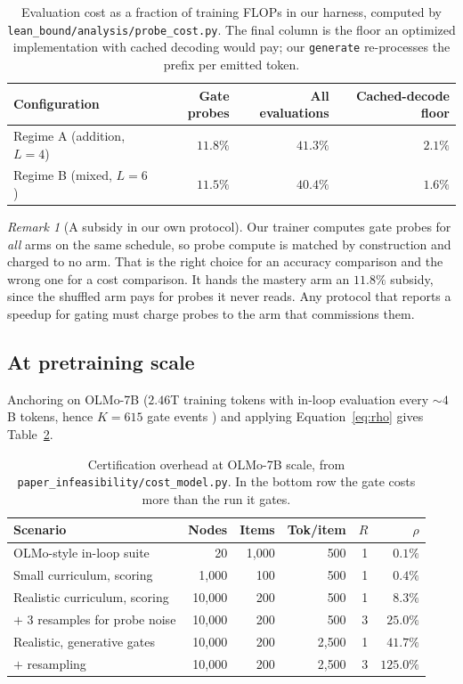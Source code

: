 \documentclass[11pt]{article}
\theoremstyle{plain}
\theoremstyle{definition}
\theoremstyle{remark}
\newtheorem{remark}{Remark}
\begin{document}
\begin{table}[ht]
\centering
\small
\begin{tabular}{@{}lrrr@{}}
\toprule
Configuration & Gate probes & All evaluations & Cached-decode floor \\
\midrule
Regime A (addition, $L{=}4$) & $11.8\%$ & $41.3\%$ & $2.1\%$ \\
Regime B (mixed, $L{=}6$) & $11.5\%$ & $40.4\%$ & $1.6\%$ \\
\bottomrule
\end{tabular}
\caption{Evaluation cost as a fraction of training FLOPs in our harness,
computed by \texttt{lean\_bound/analysis/probe\_cost.py}. The final column is the
floor an optimized implementation with cached decoding would pay; our
\texttt{generate} re-processes the prefix per emitted token.}
\label{tab:ourcost}
\end{table}

\begin{remark}[A subsidy in our own protocol]
Our trainer computes gate probes for \emph{all} arms on the same schedule, so
probe compute is matched by construction and charged to no arm. That is the right
choice for an accuracy comparison and the wrong one for a cost comparison. It
hands the mastery arm an $11.8\%$ subsidy, since the shuffled arm pays for probes
it never reads. Any protocol that reports a speedup for gating must charge probes
to the arm that commissions them.
\end{remark}

\subsection{At pretraining scale}

Anchoring on OLMo-7B ($2.46$T training tokens with in-loop evaluation every
${\sim}4$B tokens, hence $K = 615$ gate events \citep{groeneveld2024olmo}) and
applying Equation~\ref{eq:rho} gives Table~\ref{tab:scalecost}.

\begin{table}[ht]
\centering
\small
\begin{tabular}{@{}lrrrrr@{}}
\toprule
Scenario & Nodes & Items & Tok/item & $R$ & $\rho$ \\
\midrule
OLMo-style in-loop suite & 20 & 1{,}000 & 500 & 1 & $0.1\%$ \\
Small curriculum, scoring & 1{,}000 & 100 & 500 & 1 & $0.4\%$ \\
Realistic curriculum, scoring & 10{,}000 & 200 & 500 & 1 & $8.3\%$ \\
\quad $+$ 3 resamples for probe noise & 10{,}000 & 200 & 500 & 3 & $25.0\%$ \\
Realistic, generative gates & 10{,}000 & 200 & 2{,}500 & 1 & $41.7\%$ \\
\quad $+$ resampling & 10{,}000 & 200 & 2{,}500 & 3 & $\mathbf{125.0\%}$ \\
\bottomrule
\end{tabular}
\caption{Certification overhead at OLMo-7B scale, from
\texttt{paper\_infeasibility/cost\_model.py}. In the bottom row the gate costs
more than the run it gates.}
\label{tab:scalecost}
\end{table}
\end{document}
